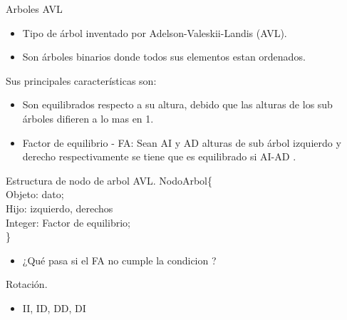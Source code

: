 \documentclass[handout]{beamer} %
\begin{document}
\begin{frame}{Arboles AVL}
  \begin{itemize}
\item Tipo de árbol inventado por Adelson-Valeskii-Landis (AVL).
\item Son árboles binarios donde todos sus elementos estan ordenados.
\end{itemize}
Sus principales características son:
\begin{itemize}
  \item Son equilibrados respecto a su altura, debido que las alturas de los sub árboles difieren a lo mas en 1.
  \item Factor de equilibrio - FA: Sean AI y AD alturas de sub árbol izquierdo y derecho respectivamente se tiene que es equilibrado si {\mid AI-AD \mid {}}.
\end{itemize}
\end{frame}

\begin{frame}{Estructura de nodo de arbol AVL. }
  NodoArbol\{ \\
    \quad \quad Objeto: dato;\\
    \quad \quad Hijo: izquierdo, derechos\\
    \quad \quad Integer: Factor de equilibrio;\\
  \}\\
  \begin{itemize}
    \item ¿Qué pasa si el FA no cumple la condicion 	 ?
  \end{itemize}
\end{frame}

\begin{frame}{Rotación. }
\begin{itemize}
  \item II, ID, DD, DI
\end{itemize}
\end{frame}
\end{document}
